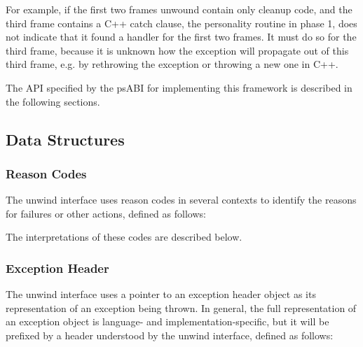 For example, if the first two frames unwound contain only cleanup code,
and the third frame contains a C++ catch clause, the personality routine
in phase 1, does not indicate that it found a handler for the first two
frames. It must do so for the third frame, because it is unknown how the
exception will propagate out of this third frame, e.g. by rethrowing the
exception or throwing a new one in C++.

The API specified by the \xARCH psABI for implementing this framework
is described in the following sections.

\subsection{Data Structures}

\subsubsection{Reason Codes}

The unwind interface uses reason codes in several contexts to identify the
reasons for failures or other actions, defined as follows:


The interpretations of these codes are described below.

\subsubsection{Exception Header}

The unwind interface uses a pointer to an exception header object
as its representation of an exception being thrown. In general,
the full representation of an exception object is language- and
implementation-specific, but it will be prefixed by a header understood
by the unwind interface, defined as follows:

